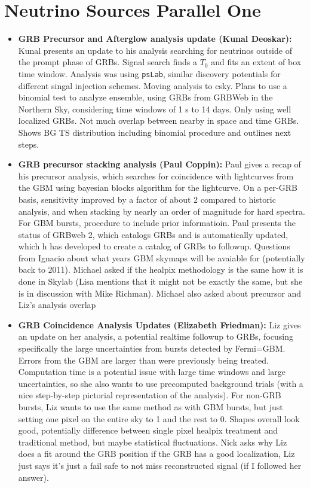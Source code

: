 \section*{Neutrino Sources Parallel One}
\begin{itemize}
    \item \textbf{GRB Precursor and Afterglow analysis update (Kunal Deoskar):} Kunal presents an update to his analysis searching for neutrinos outside of the prompt phase of GRBs. Signal search finds a $T_0$ and fits an extent of box time window. Analysis was using \texttt{psLab}, similar discovery potentials for different singal injection schemes. Moving analysis to csky. Plans to use a binomial test to analyze ensemble, using GRBs from GRBWeb in the Northern Sky, considering time windows of 1 s to 14 days. Only using well localized GRBs. Not much overlap between nearby in space and time GRBs. Shows BG TS distribution including binomial procedure and outlines next steps. 
    \item \textbf{GRB precursor stacking analysis (Paul Coppin):} Paul gives a recap of his precursor analysis, which searches for coincidence with lightcurves from the GBM using bayesian blocks algorithm for the lightcurve. On a per-GRB basis, sensitivity improved by a factor of about 2 compared to historic analysis, and when stacking by nearly an order of magnitude for hard spectra. For GBM bursts, procedure to include prior informatioin. Paul presents the status of GRBweb 2, which catalogs GRBs and is automatically updated, which h has developed to create a catalog of GRBs to followup. Questions from Ignacio about what years GBM skymaps will be avaiable for (potentially back to 2011). Michael asked if the healpix methodology is the same how it is done in Skylab (Lisa mentions that it might not be exactly the same, but she is in discussion with Mike Richman). Michael also asked about precursor and Liz's analysis overlap
    \item \textbf{GRB Coincidence Analysis Updates (Elizabeth Friedman):} Liz gives an update on her analysis, a potential realtime followup to GRBs, focusing specifically the large uncertainties from bursts detected by Fermi=GBM. Errors from the GBM are larger than were previously being treated. Computation time is a potential issue with large time windows and large uncertainties, so she also wants to use precomputed background trials (with a nice step-by-step pictorial representation of the analysis). For non-GRB bursts, Liz wants to use the same method as with GBM bursts, but just setting one pixel on the entire sky to 1 and the rest to 0. Shapes overall look good, potentially difference between single pixel healpix treatment and traditional method, but maybe statistical fluctuations. Nick asks why Liz does a fit around the GRB position if the GRB has a good localization, Liz just says it's just a fail safe to not miss reconstructed signal (if I followed her answer). 

\end{itemize}
